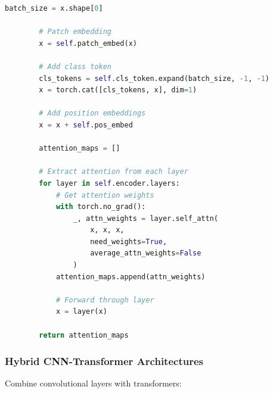 \begin{lstlisting}[language=Python, caption=Vision Transformer Implementation]
        batch_size = x.shape[0]

        # Patch embedding
        x = self.patch_embed(x)

        # Add class token
        cls_tokens = self.cls_token.expand(batch_size, -1, -1)
        x = torch.cat([cls_tokens, x], dim=1)

        # Add position embeddings
        x = x + self.pos_embed

        attention_maps = []

        # Extract attention from each layer
        for layer in self.encoder.layers:
            # Get attention weights
            with torch.no_grad():
                _, attn_weights = layer.self_attn(
                    x, x, x,
                    need_weights=True,
                    average_attn_weights=False
                )
            attention_maps.append(attn_weights)

            # Forward through layer
            x = layer(x)

        return attention_maps
\end{lstlisting}

\subsubsection{Hybrid CNN-Transformer Architectures}

Combine convolutional layers with transformers:

